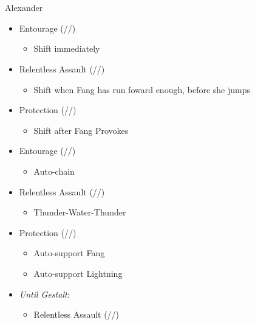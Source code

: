 \chapter[Chapter 11]{}

\renewcommand{\first}{[1] Entourage (\rav/\med/\sen)}
\renewcommand{\second}{[2] Protection (\syn/\med/\sen)}
\renewcommand{\third}{[3] }
\renewcommand{\fourth}{[4] }
\renewcommand{\fifth}{[5] }
\renewcommand{\sixth}{[6] Relentless Assault (\rav/\rav/\com)}
\begin{multicols}{2}
\begin{battle}{Alexander}
\begin{itemize}
    \item \first
    \begin{itemize}
        \item Shift immediately
    \end{itemize}
    \item \sixth
    \begin{itemize}
        \item Shift when Fang  has run foward enough, before she jumps
    \end{itemize}
    \item \second
    \begin{itemize}
        \item Shift after Fang Provokes
    \end{itemize}
    \item \first
    \begin{itemize}
        \item Auto-chain
    \end{itemize}
    \item \sixth
    \begin{itemize}
        \item Thunder-Water-Thunder
    \end{itemize}
    \item \second
    \begin{itemize}
        \item Auto-support Fang
        \item Auto-support Lightning
    \end{itemize}
    \item \textit{Until Gestalt}:
    \begin{itemize}
        \item \begin{flushleft}\sixth\end{flushleft}
        \begin{itemize}

\end{itemize}
\end{itemize}
\end{itemize}
\end{battle}
\end{multicols}
